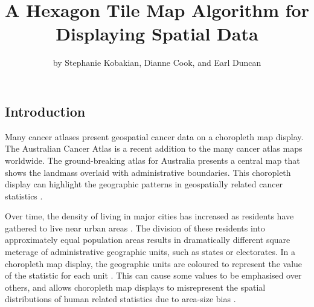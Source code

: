 \title{A Hexagon Tile Map Algorithm for Displaying Spatial Data}
\author{by Stephanie Kobakian, Dianne Cook, and Earl Duncan}

\maketitle


\hypertarget{introduction}{%
\subsection{Introduction}\label{introduction}}

Many cancer atlases present geospatial cancer data on a choropleth map
display. The Australian Cancer Atlas \citep{TACA} is a recent addition
to the many cancer atlas maps worldwide. The ground-breaking atlas for
Australia presents a central map that shows the landmass overlaid with
administrative boundaries. This choropleth display can highlight the
geographic patterns in geospatially related cancer statistics
\citep{SAMGIS}.

Over time, the density of living in major cities has increased as
residents have gathered to live near urban areas \citep{ACTUC}. The
division of these residents into approximately equal population areas
results in dramatically different square meterage of administrative
geographic units, such as states or electorates. In a choropleth map
display, the geographic units are coloured to represent the value of the
statistic for each unit \citep{EI}. This can cause some values to be
emphasised over others, and allows choropleth map displays to
misrepresent the spatial distributions of human related statistics due
to area-size bias \citep{BCM}.

